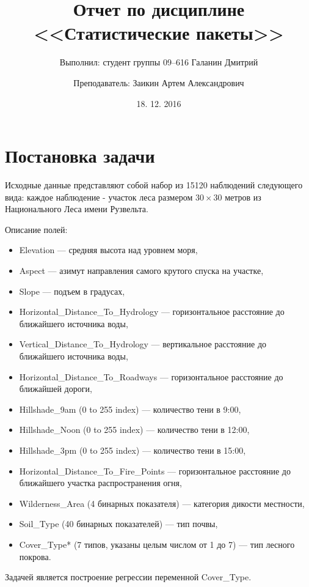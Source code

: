 \documentclass[12pt]{article}
\begin{document}
\title{Отчет по дисциплине <<Статистические пакеты>>}
\author{Выполнил: студент группы 09--616 Галанин Дмитрий \and Преподаватель: Заикин Артем Александрович}
\date{18. 12. 2016}
\maketitle
\section{Постановка задачи}
Исходные данные представляют собой набор из 15120 наблюдений следующего вида: каждое наблюдение - участок леса размером $30 \times 30$ метров из Национального Леса имени Рузвельта. 

Описание полей:
\begin{itemize}
\item Elevation --- средняя высота над уровнем моря,
\item Aspect --- азимут направления самого крутого спуска на участке,
\item Slope --- подъем в градусах,
\item Horizontal\_Distance\_To\_Hydrology --- горизонтальное расстояние до ближайшего источника воды,
\item Vertical\_Distance\_To\_Hydrology --- вертикальное расстояние до ближайшего источника воды,
\item Horizontal\_Distance\_To\_Roadways --- горизонтальное расстояние до ближайшей дороги,
\item Hillshade\_9am (0 to 255 index) --- количество тени в 9:00,
\item Hillshade\_Noon (0 to 255 index) --- количество тени в 12:00,
\item Hillshade\_3pm (0 to 255 index) --- количество тени в 15:00,
\item Horizontal\_Distance\_To\_Fire\_Points --- горизонтальное расстояние до ближайшего участка распространения огня,
\item Wilderness\_Area (4 бинарных показателя) --- категория дикости местности,
\item Soil\_Type (40 бинарных показателей) --- тип почвы,
\item Cover\_Type* (7 типов, указаны целым числом от 1 до 7) --- тип лесного покрова.
\end{itemize}
Задачей является построение регрессии переменной Cover\_Type.
\end{document}
